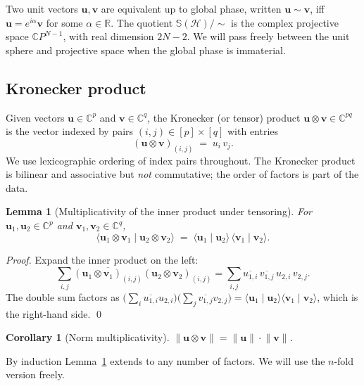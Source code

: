 \documentclass[11pt,letterpaper]{article}
\newtheorem{lemma}[theorem]{Lemma}
\newtheorem{corollary}[theorem]{Corollary}
\theoremstyle{definition}
\newcommand{\C}{\mathbb{C}}
\newcommand{\R}{\mathbb{R}}
\newcommand{\Sphere}{\mathbb{S}}
\newcommand{\Hilb}{\mathcal{H}}
\newcommand{\inner}[2]{\langle #1 \mid #2 \rangle}
\newcommand{\norm}[1]{\lVert #1 \rVert}
\begin{document}
Two unit vectors $\bm{u}, \bm{v}$ are equivalent up to global phase, written
$\bm{u} \sim \bm{v}$, iff $\bm{u} = e^{i\alpha} \bm{v}$ for some $\alpha \in
\R$. The quotient $\Sphere(\Hilb) / {\sim}$ is the complex projective space
$\C P^{N - 1}$, with real dimension $2N - 2$. We will pass freely between
the unit sphere and projective space when the global phase is immaterial.

\subsection{Kronecker product}

Given vectors $\bm{u} \in \C^{p}$ and $\bm{v} \in \C^{q}$, the Kronecker (or
tensor) product $\bm{u} \otimes \bm{v} \in \C^{pq}$ is the vector indexed by
pairs $(i,j) \in [p] \times [q]$ with entries
\[
(\bm{u} \otimes \bm{v})_{(i,j)} \;=\; u_{i}\, v_{j}.
\]
We use lexicographic ordering of index pairs throughout. The Kronecker product
is bilinear and associative but \emph{not} commutative; the order of factors
is part of the data.

\begin{lemma}[Multiplicativity of the inner product under tensoring]
\label{lem:ip-tensor}
For $\bm{u}_{1}, \bm{u}_{2} \in \C^{p}$ and $\bm{v}_{1}, \bm{v}_{2} \in \C^{q}$,
\[
\inner{\bm{u}_{1} \otimes \bm{v}_{1}}{\bm{u}_{2} \otimes \bm{v}_{2}}
   \;=\; \inner{\bm{u}_{1}}{\bm{u}_{2}}\,\inner{\bm{v}_{1}}{\bm{v}_{2}}.
\]
\end{lemma}
\begin{proof}
Expand the inner product on the left:
\[
\sum_{i,j} \overline{(\bm{u}_{1} \otimes \bm{v}_{1})_{(i,j)}}
            (\bm{u}_{2} \otimes \bm{v}_{2})_{(i,j)}
   = \sum_{i,j} \overline{u_{1,i}}\,\overline{v_{1,j}}\,u_{2,i}\,v_{2,j}.
\]
The double sum factors as $\big(\sum_{i}\overline{u_{1,i}} u_{2,i}\big)
\big(\sum_{j}\overline{v_{1,j}} v_{2,j}\big) = \inner{\bm{u}_{1}}{\bm{u}_{2}}
\inner{\bm{v}_{1}}{\bm{v}_{2}}$, which is the right-hand side. \qed
\end{proof}

\begin{corollary}[Norm multiplicativity]
\label{cor:norm-mult}
$\norm{\bm{u} \otimes \bm{v}} = \norm{\bm{u}} \cdot \norm{\bm{v}}$.
\end{corollary}

By induction Lemma~\ref{lem:ip-tensor} extends to any number of factors. We
will use the $n$-fold version freely.
\end{document}
